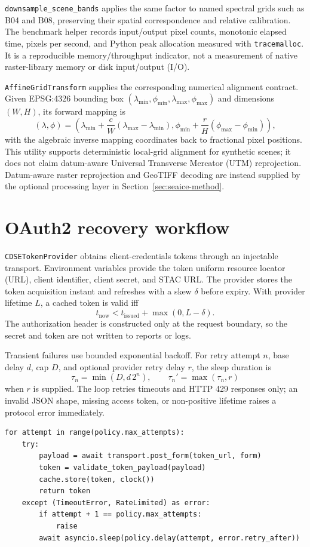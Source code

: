 \texttt{downsample\_scene\_bands} applies the same factor to named spectral grids such as B04 and
B08, preserving their spatial correspondence and relative calibration. The benchmark helper
records input/output pixel counts, monotonic elapsed time, pixels per second, and Python peak
allocation measured with \texttt{tracemalloc}. It is a reproducible memory/throughput indicator,
not a measurement of native raster-library memory or disk input/output (I/O).

\texttt{AffineGridTransform} supplies the corresponding numerical alignment contract. Given
EPSG:4326 bounding box \((\lambda_{\min},\phi_{\min},\lambda_{\max},\phi_{\max})\) and dimensions
\((W,H)\), its forward mapping is
\[
(\lambda,\phi)=
\left(\lambda_{\min}+\frac{c}{W}(\lambda_{\max}-\lambda_{\min}),
\phi_{\min}+\frac{r}{H}(\phi_{\max}-\phi_{\min})\right),
\]
with the algebraic inverse mapping coordinates back to fractional pixel positions. This utility
supports deterministic local-grid alignment for synthetic scenes; it does not claim datum-aware
Universal Transverse Mercator (UTM) reprojection. Datum-aware raster reprojection and GeoTIFF decoding are instead supplied
by the optional processing layer in Section~\ref{sec:seaice-method}.

\section{OAuth2 recovery workflow}

\texttt{CDSETokenProvider} obtains client-credentials tokens through an injectable transport.
Environment variables provide the token uniform resource locator (URL), client identifier,
client secret,
and STAC URL. The provider
stores the token acquisition instant and refreshes with a skew \(\delta\) before expiry. With
provider lifetime \(L\), a cached token is valid iff
\[
t_{\mathrm{now}} < t_{\mathrm{issued}}+ \max(0,L-\delta).
\]
The authorization header is constructed only at the request boundary, so the secret and token are
not written to reports or logs.

Transient failures use bounded exponential backoff. For retry attempt \(n\), base delay \(d\), cap
\(D\), and optional provider retry delay \(r\), the sleep duration is
\[
\tau_n=\min(D,d\,2^n),
\qquad
\tau_n'=\max(\tau_n,r)
\]
when \(r\) is supplied. The loop retries timeouts and HTTP 429 responses only; an invalid JSON
shape, missing access token, or non-positive lifetime raises a protocol error immediately.

\begin{verbatim}
for attempt in range(policy.max_attempts):
    try:
        payload = await transport.post_form(token_url, form)
        token = validate_token_payload(payload)
        cache.store(token, clock())
        return token
    except (TimeoutError, RateLimited) as error:
        if attempt + 1 == policy.max_attempts:
            raise
        await asyncio.sleep(policy.delay(attempt, error.retry_after))
\end{verbatim}


